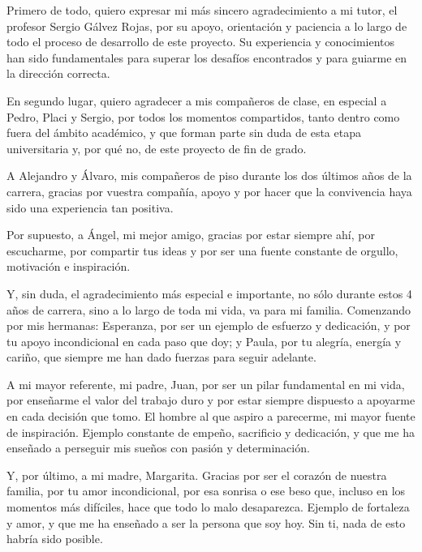 \documentclass[12pt,a4paper,twoside,openright]{book}
\begin{document}
\begin{umaacknowledgments}

Primero de todo, quiero expresar mi más sincero agradecimiento a mi tutor, el profesor Sergio Gálvez Rojas, por su apoyo, orientación y paciencia a lo largo de todo el proceso de desarrollo de este proyecto.
Su experiencia y conocimientos han sido fundamentales para superar los desafíos encontrados y para guiarme en la dirección correcta.

En segundo lugar, quiero agradecer a mis compañeros de clase, en especial a Pedro, Placi y Sergio, por todos los momentos compartidos, tanto dentro como fuera del ámbito académico, y que forman parte sin duda de esta etapa universitaria y, por qué no, de este proyecto de fin de grado.

A Alejandro y Álvaro, mis compañeros de piso durante los dos últimos años de la carrera, gracias por vuestra compañía, apoyo y por hacer que la convivencia haya sido una experiencia tan positiva.

Por supuesto, a Ángel, mi mejor amigo, gracias por estar siempre ahí, por escucharme, por compartir tus ideas y por ser una fuente constante de orgullo, motivación e inspiración.

Y, sin duda, el agradecimiento más especial e importante, no sólo durante estos 4 años de carrera, sino a lo largo de toda mi vida, va para mi familia.
Comenzando por mis hermanas: Esperanza, por ser un ejemplo de esfuerzo y dedicación, y por tu apoyo incondicional en cada paso que doy; y Paula, por tu alegría, energía y cariño, que siempre me han dado fuerzas para seguir adelante.

A mi mayor referente, mi padre, Juan, por ser un pilar fundamental en mi vida, por enseñarme el valor del trabajo duro y por estar siempre dispuesto a apoyarme en cada decisión que tomo. El hombre al que aspiro a parecerme, mi mayor fuente de inspiración.
Ejemplo constante de empeño, sacrificio y dedicación, y que me ha enseñado a perseguir mis sueños con pasión y determinación.

Y, por último, a mi madre, Margarita. Gracias por ser el corazón de nuestra familia, por tu amor incondicional, por esa sonrisa o ese beso que, incluso en los momentos más difíciles, hace que todo lo malo desaparezca.
Ejemplo de fortaleza y amor, y que me ha enseñado a ser la persona que soy hoy. Sin ti, nada de esto habría sido posible.


\end{umaacknowledgments}
\end{document}
